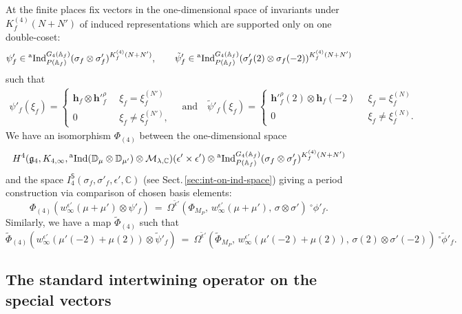 \documentclass[11pt]{amsart}
\newcommand{\D}{\mathbb D}
\newcommand{\aInd}{{}^{\rm a}{\rm Ind}}
\newcommand{\mirf}[1]{K_f^{(4)}(#1)}
\begin{document}
At the finite places fix vectors in the one-dimensional space of invariants under $\mirf{N+N'}$ of induced representations 
which are supported only on one double-coset: 
$$
\psi'_f \in \aInd_{P(\mathbb{A}_f)}^{G_4(\mathbb{A}_f)}(\sigma_f \otimes \sigma'_f)^{\mirf{N+N'}}, \qquad 
\tilde{\psi}'_f \in \aInd_{P(\mathbb{A}_f)}^{G_4(\mathbb{A}_f)}(\sigma'_f(2) \otimes \sigma_f(-2))^{\mirf{N+N'}}
$$ 
such that
\begin{gather*}
	\psi'_f(\xi_f) = \begin{cases}
		\mathbf{h}_f \otimes \mathbf{h}'^\rho_f &\,\,\, \xi_f = \xi_f^{(N')}\\
		0 &\,\,\, \xi_f \neq \xi_f^{(N')}, 
	\end{cases} \quad \text{and}\quad 
	\tilde{\psi}'_f(\xi_f) = \begin{cases}
		\mathbf{h}'^\rho_f(2) \otimes \mathbf{h}_f(-2) &\,\,\, \xi_f = \xi_f^{(N)}\\
		0 &\,\,\, \xi_f \neq \xi_f^{(N)}.
	\end{cases}
\end{gather*}
We have an isomorphism $\Phi_{(4)}$ between the one-dimensional space
$$
H^4(\mathfrak{g}_4, K_{4,\infty}, \aInd(\D_\mu \otimes \D_{\mu'}) \otimes \mathcal{M}_{\lambda, \mathbb{C}})(\epsilon' \times \epsilon')
\otimes 
\aInd_{P(\mathbb{A}_f)}^{G_4(\mathbb{A}_f)}(\sigma_f \otimes \sigma'_f)^{\mirf{N+N'}}
$$
and the space $ I_4^\mathsf{S}(\sigma_f, \sigma'_f, \epsilon', \mathbb{C})$ (see Sect.\,\ref{sec:int-on-ind-space}) giving a 
period construction via comparison of chosen basis elements:
\begin{equation}
\label{eqn: period-relation-induced-vectors}
\Phi_{(4)} (w^{\epsilon'}_{\infty}(\mu + \mu') \otimes \psi'_f) \ = \ 
\Omega^{\tilde{\epsilon}'}(\Phi_{M_P}, \, w^{\epsilon'}_{\infty}(\mu + \mu'), \, \sigma \otimes \sigma')
\ {^\circ} \phi'_f. 
\end{equation}
Similarly, we have a map $\widetilde{\Phi}_{(4)}$ such that 
\begin{equation*}
	\widetilde{\Phi}_{(4)} (w^{\epsilon'}_{\infty}(\mu'(-2) + \mu(2)) \otimes \tilde{\psi}'_f) \ = \ 
	\Omega^{\tilde{\epsilon}'}(\widetilde{\Phi}_{M_P}, \, w^{\epsilon'}_{\infty}(\mu'(-2) + \mu(2)), \, \sigma(2) \otimes \sigma'(-2))
	\ {^\circ} \tilde{\phi}'_f.
\end{equation*}



\medskip
\subsection{The standard intertwining operator on the special vectors}
\end{document}
